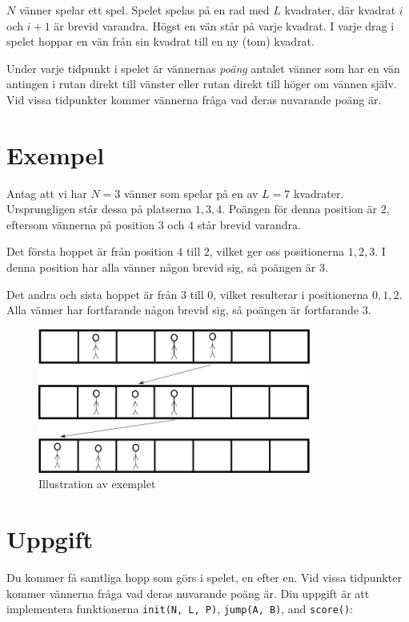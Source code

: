 \newcommand\version{v1}
$N$ vänner spelar ett spel. Spelet spelas på en rad med $L$ kvadrater, där kvadrat $i$ och $i+1$ är brevid varandra. Högst en vän står på varje kvadrat.
I varje drag i spelet hoppar en vän från sin kvadrat till en ny (tom) kvadrat.

Under varje tidpunkt i spelet är vännernas \emph{poäng} antalet vänner som har en vän antingen i rutan direkt till vänster eller rutan direkt till höger om vännen själv. Vid vissa tidpunkter kommer vännerna fråga vad deras nuvarande poäng är.

\section*{Exempel}
Antag att vi har $N = 3$ vänner som spelar på en av $L = 7$ kvadrater. Ursprungligen står dessa på platserna $1, 3, 4$. Poängen för denna position är $2$, eftersom vännerna på position $3$ och $4$ står brevid varandra.

Det första hoppet är från position $4$ till $2$, vilket ger oss positionerna $1, 2, 3$. I denna position har alla vänner någon brevid sig, så poängen är 3.

Det andra och sista hoppet är från $3$ till $0$, vilket resulterar i positionerna $0, 1, 2$. Alla vänner har fortfarande någon brevid sig, så poängen är fortfarande $3$.

\begin{figure}[h!]
  \centering
  \includegraphics[width=0.8\textwidth]{sample.png}
  \caption{Illustration av exemplet}
\end{figure}

\section*{Uppgift}
Du kommer få samtliga hopp som görs i spelet, en efter en. Vid vissa tidpunkter kommer vännerna fråga vad deras nuvarande poäng är. Din uppgift är att implementera funktionerna 
\texttt{init(N, L, P)}, \texttt{jump(A, B)}, and \texttt{score()}:

